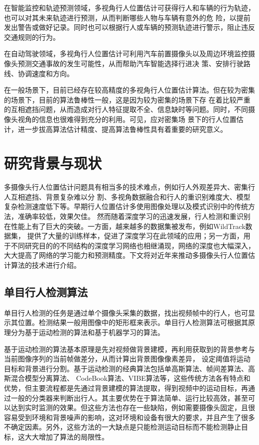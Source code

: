 在智能监控和轨迹预测领域，多视角行人位置估计可获得行人和车辆的行为轨迹，也可以对其未来轨迹进行预测，从而判断哪些人物与车辆有意外的危
险，以提前发出警告或做好记录。同时也可以根据行人或车辆的预测轨迹进行警示，阻止违反交通规则的行为。

在自动驾驶领域，多视角行人位置估计可利用汽车前置摄像头以及周边环境监控摄像头预测交通事故的发生可能性，从而帮助汽车智能选择行进决
策、安排行驶路线、协调速度和方向。

在一般场景下，目前已经存在较高精度的多视角行人位置估计算法。但在较为密集的场景下，目前的算法鲁棒性一般，这是因为较为密集的场景下存
在着比较严重的互相遮挡问题，从而造成对行人特征提取不全、信息缺时等问题。同时，不同摄像头视角的信息也很难得到充分的利用。可见，应对密集场
景下的行人位置估计，进一步拔高算法估计精度、提高算法鲁棒性具有着重要的研究意义。



\section{研究背景与现状}

多摄像头行人位置估计问题具有相当多的技术难点，例如行人外观差异大、密集行人互相遮挡、背景复杂难以分
割、多视角数据融合和行人的重识别难度大、模型复杂检测速度低下等。早期行人位置估计多使用图像处理以及模式识别中的传统方法，准确率较低，效果欠佳。
然而随着深度学习的迅速发展，行人检测和重识别在性能上有了巨大的突破。一方面，越来越多的数据集被发布，例如WildTrack\cite{wildtrack}数据集，
提供了大量的训练样本，促进了深度学习在此领域的应用；另一方面，用于不同研究目的的不同结构的深度学习网络也相继涌现，网络的深度也大幅深入，
大大提高了网络的学习能力和预测精度。下文将对近年来推动多摄像头行人位置估计算法的技术进行介绍。

\subsection{单目行人检测算法}

单目行人检测的任务是通过单个摄像头采集的数据，找出视频帧中的行人，也可显示其位置。检测结果一般用图像中的矩形框来表示。单目行人检测算法可根据其原理分为基于运动检测的算法和基于机器学习的算法。

基于运动检测的算法基本原理是先对视频做背景建模，再利用获取到的背景参考与当前图像序列的当前帧做差分，从而计算出背景图像像素差异，
设定阈值将运动目标和背景进行分割。基于运动检测的经典算法包括单高斯算法、帧间差算法、高斯混合模型分离算法\cite{zivkovic2006efficient}、
CodeBook算法\cite{codebook}、VIBE算法\cite{barnich2010vibe}等，这些传统方法各有特点和优势，但主要流程都是先通过背景建模的算法提取，得到视频中的运动目标，再通过一般的分类器来判断出行人。其主要优势在于算法简单、运行比较高效，甚至可以达到实时监测的效果。但这些方法也存在一些缺陷，例如需要摄像头固定，且很容易受到环境和背景噪声的影响，这对环境和设备有很大的要求，并且产生了很多不确定因素。另外，这些方法的一大缺点是只能检测运动目标而不能检测静止目标，这大大增加了算法的局限性。

